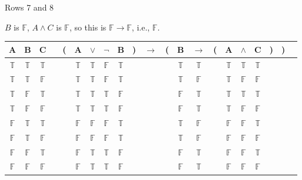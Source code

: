 \documentclass[
  ignorenonframetext,
]{beamer}
\renewcommand{\,}{\text{, }}
\def\True{\mathbb{T}}
\def\False{\mathbb{F}}
\begin{document}
\begin{frame}{Rows 7 and 8}
\protect\hypertarget{rows-7-and-8}{}

\(B\) is \(\False\), \(A \wedge C\) is \(\False\), so this is
\(\False \rightarrow \False\), i.e., \(\False\).

\begin{center}
\bigskip
\begin{tabular}{@{ }c@{ }@{ }c@{ }@{ }c | c@{ }@{}c@{}@{ }c@{ }@{ }c@{ }@{ }c@{ }@{ }c@{ }@{}c@{}@{ }c@{ }@{}c@{}@{ }c@{ }@{ }c@{ }@{}c@{}@{ }c@{ }@{ }c@{ }@{ }c@{ }@{}c@{}@{}c@{}@{ }c}
A & B & C &  & ( & A & $\vee$ & $\neg$ & B & ) & $\rightarrow$ & ( & B & $\rightarrow$ & ( & A & $\wedge$ & C & ) & ) & \\
\hline 
 $\True$ & $\True$ & $\True$ &  &  & $\True$ & $\True$ & $\False$ & $\True$ &  &&  & $\True$ & $\True$ &  & $\True$ & $\True$ & $\True$ &  &  & \\
 $\True$ & $\True$ & $\False$ &  &  & $\True$ & $\True$ & $\False$ & $\True$ &  &&  & $\True$ & $\False$ &  & $\True$ & $\False$ & $\False$ &  &  & \\
 $\True$ & $\False$ & $\True$ &  &  & $\True$ & $\True$ & $\True$ & $\False$ &  &&  & $\False$ & $\True$ &  & $\True$ & $\True$ & $\True$ &  &  & \\
 $\True$ & $\False$ & $\False$ &  &  & $\True$ & $\True$ & $\True$ & $\False$ &  &&  & $\False$ & $\True$ &  & $\True$ & $\False$ & $\False$ &  &  & \\
 $\False$ & $\True$ & $\True$ &  &  & $\False$ & $\False$ & $\False$ & $\True$ &  &&  & $\True$ & $\False$ &  & $\False$ & $\False$ & $\True$ &  &  & \\
 $\False$ & $\True$ & $\False$ &  &  & $\False$ & $\False$ & $\False$ & $\True$ &  &&  & $\True$ & $\False$ &  & $\False$ & $\False$ & $\False$ &  &  & \\
 $\False$ & $\False$ & $\True$ &  &  & $\False$ & $\True$ & $\True$ & $\False$ &  &&  & $\False$ & $\True$ &  & $\False$ & $\False$ & $\True$ &  &  & \\
 $\False$ & $\False$ & $\False$ &  &  & $\False$ & $\True$ & $\True$ & $\False$ &  &&  & $\False$ & $\True$ &  & $\False$ & $\False$ & $\False$ &  &  & \\
\end{tabular}
\bigskip
\end{center}

\end{frame}
\end{document}
